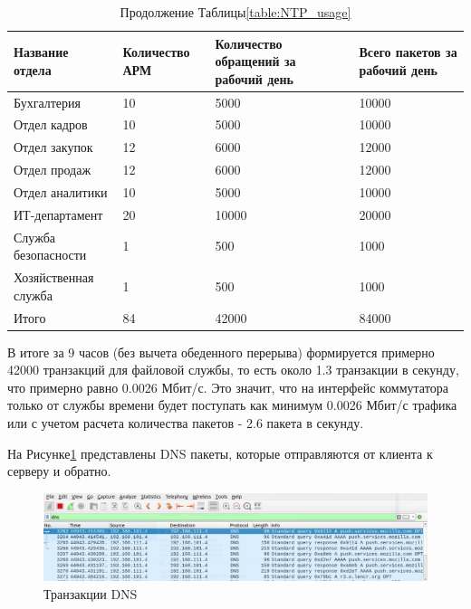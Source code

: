 \begin{table}[H]
\centering
{}
\caption{Продолжение Таблицы\;\ref{table:NTP_usage}}
\small
\begin{tabularx}{\textwidth}{|X|X|X|X|}
\hline
	Название отдела	&	Количество АРМ	&	Количество обращений за рабочий день	&	Всего пакетов за рабочий день \\ \hline
		Бухгалтерия						& 10         	&  	5000				&	10000  \\
		\hline
		Отдел кадров					& 10         	&  	5000				&	10000  \\
        \hline
		Отдел закупок					& 12         	&  	6000				&	12000  \\
        \hline
		Отдел продаж					& 12         	&  	6000				&	12000  \\
        \hline
		Отдел аналитики					& 10         	&  	5000				&	10000  \\
        \hline
		ИТ-департамент					& 20         	&  	10000				&	20000  \\
        \hline
		Служба безопасности				& 1				& 	500					&	1000	  \\
		\hline
		Хозяйственная служба			& 1         	&  	500					&	1000  \\
        \hline
		Итого							& 84			&	42000				& 	84000 \\  
		\hline
\end{tabularx}
\end{table}

В итоге за 9 часов (без вычета обеденного перерыва) формируется примерно 42000 транзакций для файловой службы, то есть около 1.3 транзакции в секунду, что примерно равно 0.0026 Мбит/с. Это значит, что на интерфейс коммутатора только от службы времени будет поступать как минимум 0.0026 Мбит/с трафика или с учетом расчета количества пакетов - 2.6 пакета в секунду.

На Рисунке\;\ref{fig:DNS_wireshark} представлены DNS пакеты, которые отправляются от клиента к серверу и обратно.

\begin{figure}[H]
\centering
\includegraphics[scale=0.4]{../misc/DNS_wireshark.png}
\caption{Транзакции DNS\label{fig:DNS_wireshark}}
\end{figure}

